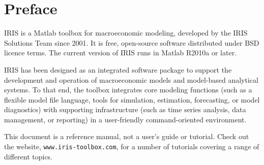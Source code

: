 
\section *{Preface}

IRIS is a Matlab\raisebox{0.3em}{\tiny\textregistered} toolbox for macroeconomic modeling, developed by the IRIS Solutions Team since 2001. It is free, open-source software distributed under BSD licence terms. The current version of IRIS runs in Matlab R2010a or later.

IRIS has been designed as an integrated software package to support the development and operation of macroeconomic models and model-based analytical systems. To that end, the toolbox integrates core modeling functions (such as a flexible model file language, tools for simulation, estimation, forecasting, or model diagnostics) with supporting infrastructure (such as time series analysis, data management, or reporting) in a user-friendly command-oriented environment.

This document is a reference manual, not a user's guide or tutorial. Check out the website, \texttt{www.iris-toolbox.com}, for a number of tutorials covering a range of different topics.

